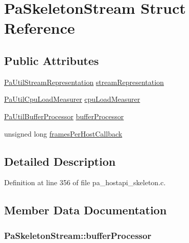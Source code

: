 \hypertarget{struct_pa_skeleton_stream}{}\section{Pa\+Skeleton\+Stream Struct Reference}
\label{struct_pa_skeleton_stream}
\subsection*{Public Attributes}
\begin{DoxyCompactItemize}
\item 
\hyperlink{struct_pa_util_stream_representation}{Pa\+Util\+Stream\+Representation} \hyperlink{struct_pa_skeleton_stream_ac27b2f15cde70bca623fd136551fb39f}{stream\+Representation}
\item 
\hyperlink{struct_pa_util_cpu_load_measurer}{Pa\+Util\+Cpu\+Load\+Measurer} \hyperlink{struct_pa_skeleton_stream_a08f29860fb1ea431f9a11a7592a6804b}{cpu\+Load\+Measurer}
\item 
\hyperlink{struct_pa_util_buffer_processor}{Pa\+Util\+Buffer\+Processor} \hyperlink{struct_pa_skeleton_stream_a23340e71dbeedcef3b7cf432850c6649}{buffer\+Processor}
\item 
unsigned long \hyperlink{struct_pa_skeleton_stream_a12503be191ef447234f5c53a4c53b49b}{frames\+Per\+Host\+Callback}
\end{DoxyCompactItemize}


\subsection{Detailed Description}


Definition at line 356 of file pa\+\_\+hostapi\+\_\+skeleton.\+c.



\subsection{Member Data Documentation}
\subsubsection[{\texorpdfstring{buffer\+Processor}{bufferProcessor}}]{ Pa\+Skeleton\+Stream\+::buffer\+Processor}\hypertarget{struct_pa_skeleton_stream_a23340e71dbeedcef3b7cf432850c6649}{}\label{struct_pa_skeleton_stream_a23340e71dbeedcef3b7cf432850c6649}


